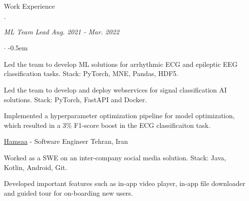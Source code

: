 \documentclass[../professional-cv.tex]{subfiles}
\begin{document}
\begin{rSection}{Work Experience}
\begin{rWorkSection}
\begin{list}{$\cdot$}{\leftmargin=10pt\normalfont \rightmargin=20pt}
			\end{list}
			{\em ML Team Lead} \hfill {\em Aug. 2021 - Mar. 2022}
			\normalfont
			\begin{list}{$\cdot$}{\leftmargin=10pt\normalfont \rightmargin=20pt}
				\itemsep -0.5em
				\item Led the team to develop ML solutions for arrhythmic ECG and epileptic EEG classification tasks. Stack: PyTorch, MNE, Pandas, HDF5.
				\item Led the team to develop and deploy webservices for signal classification AI solutions. Stack: PyTorch, FastAPI and Docker.
				\item Implemented a hyperparameter optimization pipeline for model optimization, which resulted in a 3\% F1-score boost in the ECG classificaiton task.
			\end{list}
		\end{rWorkSection}
		
		\begin{rSubsection}
			{\href{https://hamsaa.ir}{Hamsaa}}
			{  -  }
			{Software Engineer}
			{Tehran, Iran}
			\item Worked as a SWE on an inter-company social media solution. Stack: Java, Kotlin, Android, Git.
			\item Developed important features such as in-app video player, in-app file downloader and guided tour for on-boarding new users.
			
		\end{rSubsection}

		
	
	\end{rSection}
\end{document}
